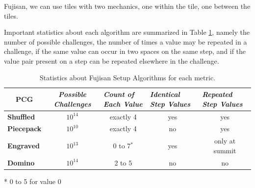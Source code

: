 \documentclass[journal]{IEEEtran}
\begin{document}
Fujisan, we can use tiles with two mechanics, one within the tile, one between the tiles.

Important statistics about each algorithm are summarized in Table \ref{table_stats}, namely the number of possible challenges, the number of times a value may be repeated in a challenge, if the same value can occur in two spaces on the same step, and if the value pair present on a step can be repeated elsewhere in the challenge.

\begin{table}[]
\centering
\renewcommand{\arraystretch}{1.3}
\caption{Statistics about Fujisan Setup Algorithms for each metric.}
\label{table_stats}
\begin{tabular}{l|c|c|c|c|}
\multicolumn{1}{c|}{\textbf{PCG}} & \multicolumn{1}{c|}{\textit{\textbf{Possible Challenges}}} & \multicolumn{1}{l|}{\textit{\textbf{Count of Each Value}}} & \multicolumn{1}{l|}{\textit{\textbf{Identical Step Values}}} & \multicolumn{1}{l|}{\textit{\textbf{Repeated Step Values}}} \\ \hline
\textbf{Shuffled}                 & $10^{14}$ & exactly 4                                                  & yes                                                      & yes                                                            \\ \hline
\textbf{Piecepack}                & $10^{10}$                                             & exactly 4                                                  & no                                                       & yes                                                            \\ \hline
\textbf{Engraved}                 & $10^{13}$                                                 & 0 to 7$^*$                                                     & yes                                                      & only at summit                                                 \\ \hline
\textbf{Domino}                   & $10^{14} $                                                   & 2 to 5                                                     & no                                                       & no                                                             \\ \hline
\end{tabular}

\vspace{0.2cm} * 0 to 5 for value 0
\end{table}
\end{document}
